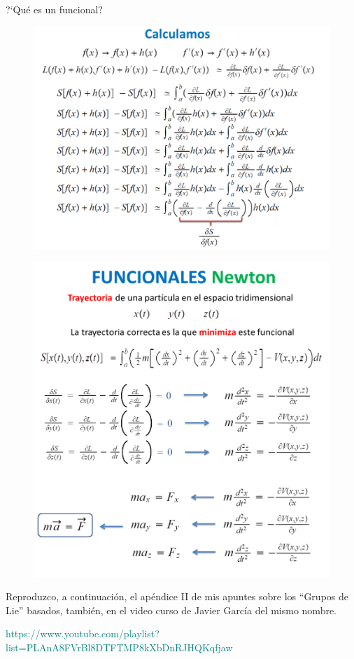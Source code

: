 \begin{myexampleblock}{ ?`Qué es un funcional?}
\begin{figure}[H]
		\centering
		\includegraphics[width=.9\textwidth]{imagenes/img08-02b.png}
	\end{figure}
	
\begin{figure}[H]
		\centering
		\includegraphics[width=.8\textwidth]{imagenes/img08-03.png}
	\end{figure}

\end{myexampleblock}

\begin{ejemplo}
\vspace{2mm}

Reproduzco, a continuación, el apéndice II de mis apuntes sobre los ``Grupos de Lie'' basados, también, en el video curso de Javier García del mismo nombre. 

\textcolor{teal}{
\begin{footnotesize}
{https://www.youtube.com/playlist?list=PLAnA8FVrBl8DTFTMP8kXbDnRJHQKqfjaw}	
\end{footnotesize} }
\vspace{2mm}
\end{ejemplo}


\newpage







